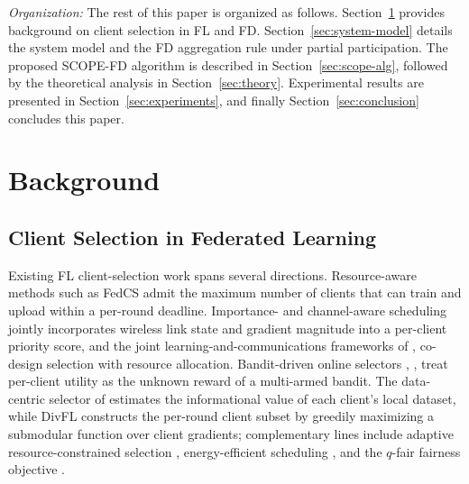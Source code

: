 \documentclass[journal]{IEEEtran}
\begin{document}

\textit{Organization:} The rest of this paper is organized as follows. Section~\ref{sec:related-work} provides background on client selection in FL and FD. Section~\ref{sec:system-model} details the system model and the FD aggregation rule under partial participation. The proposed SCOPE-FD algorithm is described in Section~\ref{sec:scope-alg}, followed by the theoretical analysis in Section~\ref{sec:theory}. Experimental results are presented in Section~\ref{sec:experiments}, and finally Section~\ref{sec:conclusion} concludes this paper.

\section{Background}
\label{sec:related-work}

\subsection{Client Selection in Federated Learning}
\label{ssec:rw-fl-selection}

Existing FL client-selection work spans several directions. Resource-aware methods such as FedCS \cite{nishio2019client} admit the maximum number of clients that can train and upload within a per-round deadline. Importance- and channel-aware scheduling \cite{yang2020scheduling, ren2020scheduling, shi2020joint} jointly incorporates wireless link state and gradient magnitude into a per-client priority score, and the joint learning-and-communications frameworks of \cite{chen2021joint}, \cite{chen2021convergence} co-design selection with resource allocation. Bandit-driven online selectors \cite{xia2020mab}, \cite{cho2020bandit}, \cite{xu2021online} treat per-client utility as the unknown reward of a multi-armed bandit. The data-centric selector of \cite{saha2023datacentric} estimates the informational value of each client's local dataset, while DivFL \cite{balakrishnan2022divfl} constructs the per-round client subset by greedily maximizing a submodular function over client gradients; complementary lines include adaptive resource-constrained selection \cite{wang2019adaptive}, energy-efficient scheduling \cite{yang2021energy}, and the $q$-fair fairness objective \cite{li2020qffl}.
\end{document}
